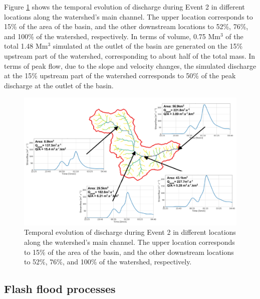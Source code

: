 \documentclass[hess, manuscript]{copernicus}
\begin{document}
Figure \ref{fig:dischargeEvent2} shows the temporal evolution of discharge during Event 2 in different locations along the watershed's main channel. The upper location corresponds to 15\% of the area of the basin, and the other downstream locations to 52\%, 76\%, and 100\% of the watershed, respectively. In terms of volume, 0.75 Mm$^3$ of the total 1.48 Mm$^3$ simulated at the outlet of the basin are generated on the 15\% upstream part of the watershed,  corresponding to about half of the total mass. In terms of peak flow, due to the slope and velocity changes, the simulated discharge at the 15\% upstream part of the watershed corresponds to 50\% of the peak discharge at the outlet of the basin.\\


\begin{figure}[t]
\centering
\includegraphics[width =12cm]{Figures/Evolucion_evento.png}
\caption{Temporal evolution of discharge during Event 2 in different locations along the watershed's main channel. The upper location corresponds to 15\% of the area of the basin, and the other downstream locations to 52\%, 76\%, and 100\% of the watershed, respectively.}
\label{fig:dischargeEvent2}
\end{figure}

\subsection{Flash flood processes}

\end{document}
